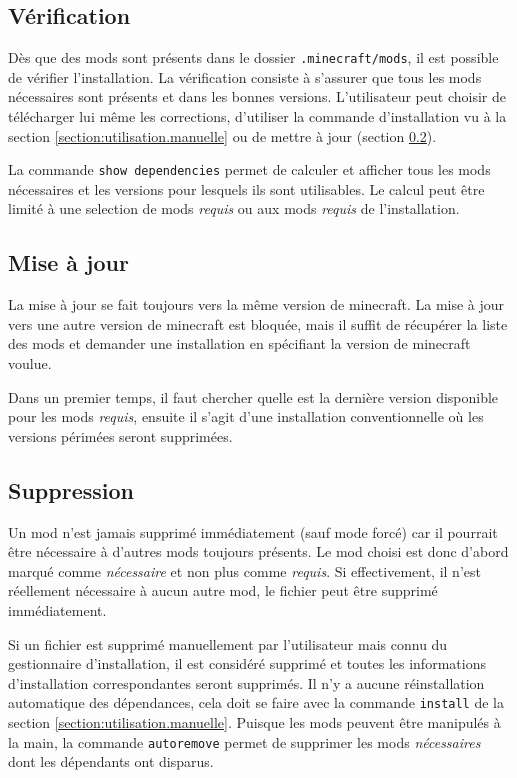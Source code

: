 \documentclass{article}
\begin{document}
\subsection{Vérification}
Dès que des mods sont présents dans le dossier \texttt{.minecraft/mods}, il est possible de vérifier l'installation.
La vérification consiste à s'assurer que tous les mods nécessaires sont présents et dans les bonnes versions.
L'utilisateur peut choisir de télécharger lui même les corrections, d'utiliser la commande d'installation vu à la section \ref{section:utilisation.manuelle} ou de mettre à jour (section \ref{section:utilisation.miseajour}).

La commande \texttt{show dependencies} permet de calculer et afficher tous les mods nécessaires et les versions pour lesquels ils sont utilisables.
Le calcul peut être limité à une selection de mods \textit{requis} ou aux mods \textit{requis} de l'installation.

\subsection{Mise à jour}
\label{section:utilisation.miseajour}
La mise à jour se fait toujours vers la même version de minecraft.
La mise à jour vers une autre version de minecraft est bloquée, mais il suffit de récupérer la liste des mods et demander une installation en spécifiant la version de minecraft voulue.

Dans un premier temps, il faut chercher quelle est la dernière version disponible pour les mods \textit{requis}, ensuite il s'agit d'une installation conventionnelle où les versions périmées seront supprimées.

\subsection{Suppression}
Un mod n'est jamais supprimé immédiatement (sauf mode forcé) car il pourrait être nécessaire à d'autres mods toujours présents.
Le mod choisi est donc d'abord marqué comme \textit{nécessaire} et non plus comme \textit{requis}.
Si effectivement, il n'est réellement nécessaire à aucun autre mod, le fichier peut être supprimé immédiatement.

Si un fichier est supprimé manuellement par l'utilisateur mais connu du gestionnaire d'installation, il est considéré supprimé et toutes les informations d'installation correspondantes seront supprimés.
Il n'y a aucune réinstallation automatique des dépendances, cela doit se faire avec la commande \texttt{install} de la section \ref{section:utilisation.manuelle}.
Puisque les mods peuvent être manipulés à la main, la commande \texttt{autoremove} permet de supprimer les mods \textit{nécessaires} dont les dépendants ont disparus.
\end{document}
